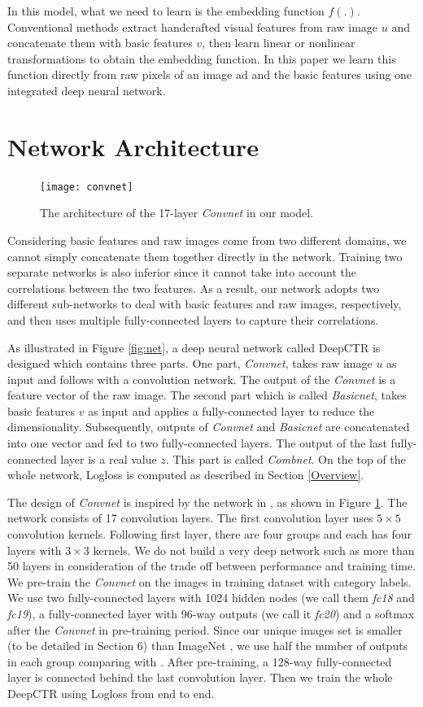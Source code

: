 \documentclass{sig-alternate}
\begin{document}
In this model, what we need to learn is the embedding function $f(.)$. Conventional methods extract handcrafted visual features from raw image $u$ and concatenate them with basic features $v$, then learn linear or nonlinear transformations to obtain the embedding function. In this paper we learn this function directly from raw pixels of an image ad and the basic features using one integrated deep neural network.  
\section{Network Architecture}
\begin{figure}
	\centering
	\texttt{[image: convnet]}
	\caption{The architecture of the 17-layer \emph{Convnet} in our model.}
	\label{fig:convnet}
\end{figure}
Considering basic features and raw images come from two different domains, we cannot simply concatenate them together directly in the network. Training two separate networks is also inferior since it cannot take into account the correlations between the two features. As a result, our network adopts two different sub-networks to deal with basic features and raw images, respectively, and then uses multiple fully-connected layers to capture their correlations. 

As illustrated in Figure \ref{fig:net},  a  deep neural network called DeepCTR is designed which contains three parts. 
One part, \emph{Convnet}, takes raw image $u$ as input and follows with a convolution network. 
The output of the \emph{Convnet} is a feature vector of the raw image. 
The second part which is called \emph{Basicnet}, takes basic features $v$ as input and applies a fully-connected layer to reduce the dimensionality. 
Subsequently, outputs of \emph{Convnet} and \emph{Basicnet} are concatenated into one vector and fed to two fully-connected layers. 
The output of the last fully-connected layer is a real value $z$.
This part is called \emph{Combnet}. On the top of the whole network, Logloss is computed as described in Section \ref{Overview}.

The design of \emph{Convnet} is inspired by the network in \cite{he2015deep,simonyan2014very}, as shown in Figure \ref{fig:convnet}. The network consists of 17 convolution layers. The first convolution layer uses $5 \times 5$ convolution kernels. Following first layer, there are four groups and each has four layers with $3 \times 3$ kernels.  We do not build a very deep network such as more than 50 layers in consideration of the trade off between performance and training time. We pre-train the \emph{Convnet} on the images in training dataset with category labels. We use two fully-connected layers with 1024 hidden nodes (we call them \emph{fc18} and \emph{fc19}), a fully-connected layer with 96-way outputs (we call it \emph{fc20}) and a softmax after the \emph{Convnet} in pre-training period.  Since our unique images set is smaller (to be detailed in Section 6) than ImageNet \cite{deng2009imagenet}, we use half the number of outputs in each group comparing with \cite{he2015deep}. After pre-training,  a 128-way fully-connected layer is connected behind the last convolution layer.  Then we train the whole DeepCTR using Logloss from end to end.
\end{document}
